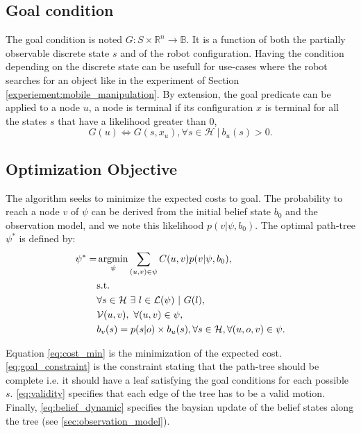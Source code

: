 \documentclass[letterpaper, 10 pt, conference]{ieeeconf}  %
\DeclareMathOperator*{\argmin}{argmin} %
\begin{document}
\subsection{Goal condition}
The goal condition is noted $G: S \times \mathbb{R}^n \rightarrow \mathbb{B}$. It is a function of both the partially observable discrete state $s$ and of the robot configuration. Having the condition depending on the discrete state can be usefull for use-cases where the robot searches for an object like in the experiment of Section \ref{experiement:mobile_manipulation}.
By extension, the goal predicate can be applied to a node $u$, a node is terminal if its configuration $x$ is terminal for all the states $s$ that have a likelihood greater than 0,
\begin{equation}
G(u) \iff G(s, x_u), \forall s \in \mathcal{H}\ |\ b_u(s) > 0.
\end{equation}
 
\subsection{Optimization Objective}

The algorithm seeks to minimize the expected costs to goal. The probability to reach a node $v$ of $\psi$ can be derived from the initial belief state $b_0$ and the observation model, and we note this likelihood $p(v | \psi, b_0)$. 
The optimal path-tree $\psi^*$ is defined by:
\begin{subequations}
\label{eq:optimization_objective}
\begin{align}
\psi^* = &\argmin_{\psi} \sum_{(u, v) \in \psi} C(u, v) p(v | \psi, b_0), \label{eq:cost_min}\\
&\text{s.t.} \notag \\
&\forall s \in \mathcal{H}\ \exists\ l \in \mathcal{L}(\psi) \ |\ G(l), \label{eq:goal_constraint}\\
&\mathcal{V}(u, v), \ \forall (u, v) \in \psi \label{eq:validity}, \\
&b_v(s) = p(s | o) \times b_u(s), \forall s \in \mathcal{H}, \forall (u, o, v) \in \psi. \label{eq:belief_dynamic}
\end{align}
\end{subequations}

Equation \ref{eq:cost_min} is the minimization of the expected cost. \ref{eq:goal_constraint} is the constraint stating that the path-tree should be complete i.e. it should have a leaf satisfying the goal conditions for each possible $s$. \ref{eq:validity} specifies that each edge of the tree has to be a valid motion. Finally, \ref{eq:belief_dynamic} specifies the baysian update of the belief states along the tree (see \ref{sec:observation_model}).
\end{document}
